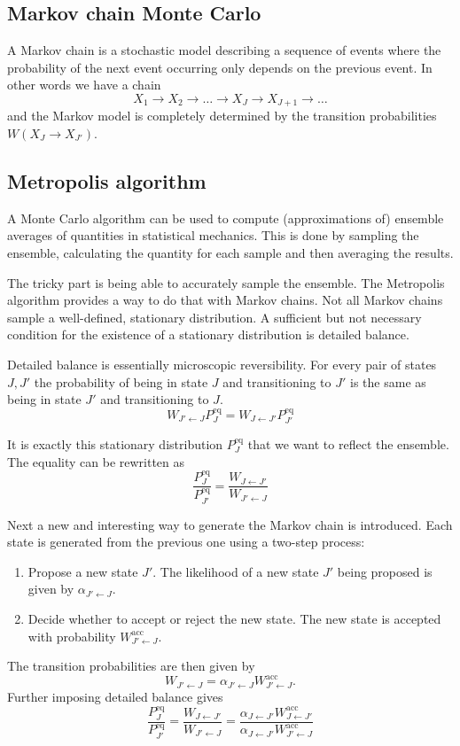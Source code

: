 \documentclass{report}
\begin{document}
\subsection{Markov chain Monte Carlo}
A Markov chain is a stochastic model describing a sequence of events where the probability of the next event occurring only depends on the previous event. In other words we have a chain
\[ X_1 \to X_2 \to \ldots \to X_J \to X_{J+1}\to \ldots \]
and the Markov model is completely determined by the transition probabilities $W(X_J \to X_{J'})$.

\subsection{Metropolis algorithm}
A Monte Carlo algorithm can be used to compute (approximations of) ensemble averages of quantities in statistical mechanics. This is done by sampling the ensemble, calculating the quantity for each sample and then averaging the results.

The tricky part is being able to accurately sample the ensemble. The Metropolis algorithm provides a way to do that with Markov chains. Not all Markov chains sample a well-defined, stationary distribution. A sufficient but not necessary condition for the existence of a stationary distribution is detailed balance.

Detailed balance is essentially microscopic reversibility. For every pair of states $J,J'$ the probability of being in state $J$ and transitioning to $J'$ is the same as being in state $J'$ and transitioning to $J$.
\[ W_{J'\leftarrow J}P^\text{eq}_J = W_{J\leftarrow J'}P^\text{eq}_{J'} \]

It is exactly this stationary distribution $P^\text{eq}_J$ that we want to reflect the ensemble. The equality can be rewritten as
\[ \frac{P^\text{eq}_J}{P^\text{eq}_{J'}} = \frac{W_{J\leftarrow J'}}{W_{J'\leftarrow J}} \]

Next a new and interesting way to generate the Markov chain is introduced. Each state is generated from the previous one using a two-step process:
\begin{enumerate}
\item Propose a new state $J'$. The likelihood of a new state $J'$ being proposed is given by $\alpha_{J'\leftarrow J}$.
\item Decide whether to accept or reject the new state. The new state is accepted with probability $W^\text{acc}_{J'\leftarrow J}$.
\end{enumerate}
The transition probabilities are then given by 
\[ W_{J'\leftarrow J} = \alpha_{J'\leftarrow J}W^\text{acc}_{J'\leftarrow J}. \]
Further imposing detailed balance gives
\[ \frac{P^\text{eq}_J}{P^\text{eq}_{J'}} = \frac{W_{J\leftarrow J'}}{W_{J'\leftarrow J}} = \frac{\alpha_{J\leftarrow J'}W^\text{acc}_{J\leftarrow J'}}{\alpha_{J\leftarrow J'}W^\text{acc}_{J'\leftarrow J}} \]
\end{document}
